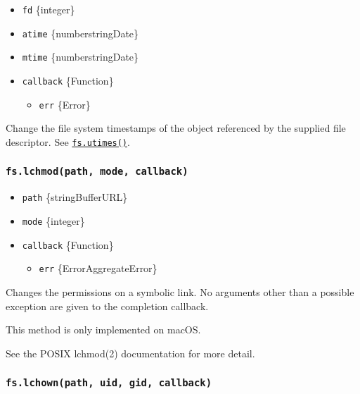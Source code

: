 \begin{itemize}
\tightlist
\item
  \texttt{fd} \{integer\}
\item
  \texttt{atime} \{number\textbar string\textbar Date\}
\item
  \texttt{mtime} \{number\textbar string\textbar Date\}
\item
  \texttt{callback} \{Function\}

  \begin{itemize}
  \tightlist
  \item
    \texttt{err} \{Error\}
  \end{itemize}
\end{itemize}

Change the file system timestamps of the object referenced by the
supplied file descriptor. See
\hyperref[fsutimespath-atime-mtime-callback]{\texttt{fs.utimes()}}.

\subsubsection{\texorpdfstring{\texttt{fs.lchmod(path,\ mode,\ callback)}}{fs.lchmod(path, mode, callback)}}\label{fs.lchmodpath-mode-callback}

\begin{itemize}
\tightlist
\item
  \texttt{path} \{string\textbar Buffer\textbar URL\}
\item
  \texttt{mode} \{integer\}
\item
  \texttt{callback} \{Function\}

  \begin{itemize}
  \tightlist
  \item
    \texttt{err} \{Error\textbar AggregateError\}
  \end{itemize}
\end{itemize}

Changes the permissions on a symbolic link. No arguments other than a
possible exception are given to the completion callback.

This method is only implemented on macOS.

See the POSIX lchmod(2) documentation for more detail.

\subsubsection{\texorpdfstring{\texttt{fs.lchown(path,\ uid,\ gid,\ callback)}}{fs.lchown(path, uid, gid, callback)}}\label{fs.lchownpath-uid-gid-callback}

